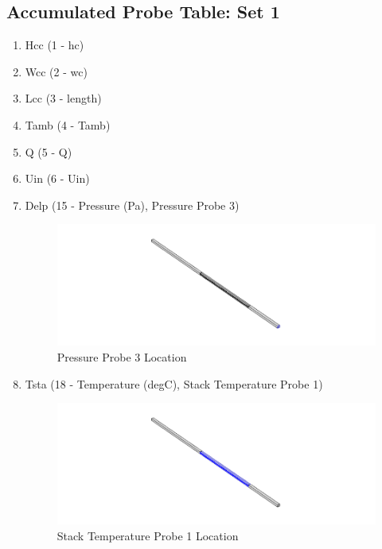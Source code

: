         \subsection{Accumulated Probe Table: Set 1}
            \begin{enumerate}
                \item Hcc (1 - hc)
                \item Wcc (2 - wc)
                \item Lcc (3 - length)
                \item Tamb (4 - Tamb)
                \item Q (5 - Q)
                \item Uin (6 - Uin)
                \item Delp (15 - Pressure (Pa), Pressure Probe 3)
                    \begin{figure}[H]
                        \centering
                        \includegraphics[width=1\textwidth]{00_Images/00_Pressure_Probe_3.png}
                        \caption{Pressure Probe 3 Location}
                    \end{figure}
                \item Tsta (18 - Temperature (degC), Stack Temperature Probe 1)
                    \begin{figure}[H]
                        \centering
                        \includegraphics[width=1\textwidth]{00_Images/00_Stack_Temperature_Probe_1.png}
                        \caption{Stack Temperature Probe 1 Location}
                    \end{figure}
            \end{enumerate}

